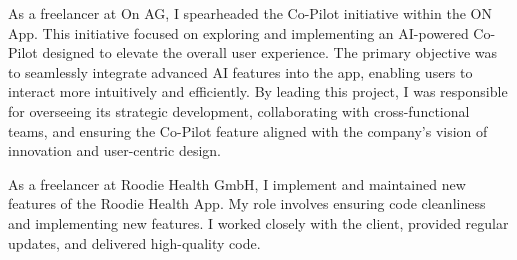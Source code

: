 \documentclass[10pt,a4paper]{altacv}
\begin{document}
\begin{itemize}



As a freelancer at On AG, I spearheaded the Co-Pilot initiative within the ON App. This initiative focused on exploring and implementing an AI-powered Co-Pilot designed to elevate the overall user experience. The primary objective was to seamlessly integrate advanced AI features into the app, enabling users to interact more intuitively and efficiently. By leading this project, I was responsible for overseeing its strategic development, collaborating with cross-functional teams, and ensuring the Co-Pilot feature aligned with the company's vision of innovation and user-centric design.

\newline
\newline



\newpage
\begin{fullwidth}
    







As a freelancer at Roodie Health GmbH, I implement and maintained new features of the Roodie Health App. My role involves ensuring code cleanliness and implementing new features. I worked closely with the client, provided regular updates, and delivered high-quality code. 
\newline
\newline


\newline
\divider
    


\end{fullwidth}
\end{itemize}
\end{document}

